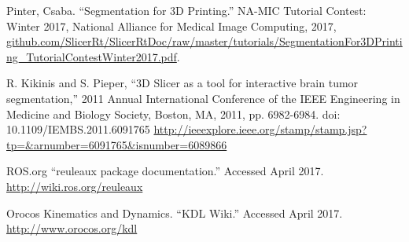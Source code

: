 \documentclass[12pt]{report}
\begin{document}
\begin{thebibliography}{99}
 Pinter, Csaba. ``Segmentation for 3D Printing.'' NA-MIC Tutorial Contest: Winter 2017, National Alliance for Medical Image Computing, 2017, \url{github.com/SlicerRt/SlicerRtDoc/raw/master/tutorials/SegmentationFor3DPrinting_TutorialContestWinter2017.pdf}.

 R. Kikinis and S. Pieper, ``3D Slicer as a tool for interactive brain tumor segmentation,'' 2011 Annual International Conference of the IEEE Engineering in Medicine and Biology Society, Boston, MA, 2011, pp. 6982-6984. doi: 10.1109/IEMBS.2011.6091765 \url{http://ieeexplore.ieee.org/stamp/stamp.jsp?tp=&arnumber=6091765&isnumber=6089866}

 ROS.org ``reuleaux package documentation.'' Accessed April 2017. \url{http://wiki.ros.org/reuleaux}

 Orocos Kinematics and Dynamics. ``KDL Wiki.'' Accessed April 2017. \url{http://www.orocos.org/kdl}

\end{thebibliography}

% 
% 

%

%
\end{document}
